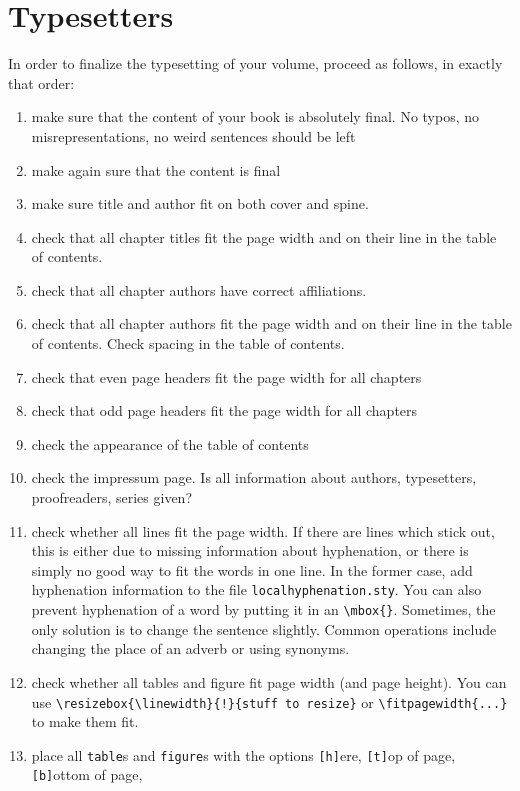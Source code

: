 \chapter{Typesetters}
In order to finalize the typesetting of your volume, proceed as follows, in exactly that order:

\begin{enumerate}
 \item make sure that the content of your book is absolutely final. No typos, no misrepresentations, no weird sentences should be left
 \item make again sure that the content is final 
 \item make sure title and author fit on both cover and spine. 
 \item check that all chapter titles fit the page width and on their line in the table of contents. 
 \item check that all chapter authors have correct affiliations.
 \item check that all chapter authors fit the page width and on their line in the table of contents. Check spacing in the table of contents. 
 \item check that even page headers fit the page width for all chapters
 \item check that odd page headers fit the page width for all chapters
 \item check the appearance of the table of contents
 \item check the impressum page. Is all information about authors, typesetters, proofreaders, series given?
 \item check whether all lines fit the page width. If there are lines which stick out, this is either due to missing information about hyphenation, or there is simply no good way to fit the words in one line. In the former case, add hyphenation information to the file \verb+localhyphenation.sty+. You can also prevent hyphenation of a word by putting it in an \verb+\mbox{}+. Sometimes, the only solution is to change the sentence slightly. Common operations include changing the place of an adverb or using synonyms.
 \item check whether all tables and figure fit page width (and page height). You can use \verb+\resizebox{\linewidth}{!}{stuff to resize}+ or \verb+\fitpagewidth{...}+  to make them fit.
 \item place all \verb+table+s and \verb+figure+s with the options 
\texttt{[h]}ere, 
\texttt{[t]}op of page, 
\texttt{[b]}ottom of page,

\end{enumerate}
